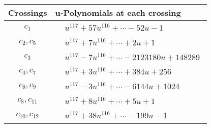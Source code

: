 \documentclass[1p]{elsarticle_modified}
\theoremstyle{definition}
\begin{document}
\begin{tabular}{m{50pt}|m{274pt}}
Crossings & \hspace{64pt}u-Polynomials at each crossing \\
\hline $$\begin{aligned}c_{1}\end{aligned}$$&$\begin{aligned}
&u^{117}+57 u^{116}+\cdots-52 u-1
\end{aligned}$\\
\hline $$\begin{aligned}c_{2},c_{5}\end{aligned}$$&$\begin{aligned}
&u^{117}+7 u^{116}+\cdots+2 u+1
\end{aligned}$\\
\hline $$\begin{aligned}c_{3}\end{aligned}$$&$\begin{aligned}
&u^{117}-7 u^{116}+\cdots-2123180 u+148289
\end{aligned}$\\
\hline $$\begin{aligned}c_{4},c_{7}\end{aligned}$$&$\begin{aligned}
&u^{117}+3 u^{116}+\cdots+384 u+256
\end{aligned}$\\
\hline $$\begin{aligned}c_{6},c_{9}\end{aligned}$$&$\begin{aligned}
&u^{117}-3 u^{116}+\cdots-6144 u+1024
\end{aligned}$\\
\hline $$\begin{aligned}c_{8},c_{11}\end{aligned}$$&$\begin{aligned}
&u^{117}+8 u^{116}+\cdots+5 u+1
\end{aligned}$\\
\hline $$\begin{aligned}c_{10},c_{12}\end{aligned}$$&$\begin{aligned}
&u^{117}+38 u^{116}+\cdots-199 u-1
\end{aligned}$\\
\hline
\end{tabular}\\~\\
\newpage\renewcommand{\arraystretch}{1}
\end{document}
